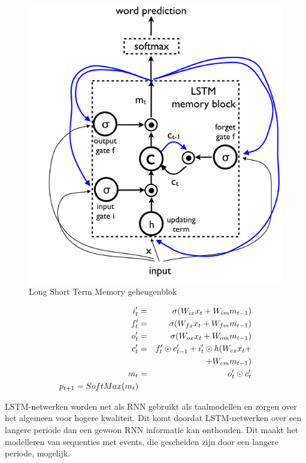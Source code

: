 \begin{figure}[tb]
    \centering
    \includegraphics[width=\linewidth]{Images/lstm.PNG}
    \caption{Long Short Term Memory geheugenblok}
    \label{fig:lstm}
\end{figure}

\begin{eqnarray}
\vspace{-3mm}
\label{glstm-memory-start}
i_t' & = & \sigma (W_{ix} x_t + W_{im} m_{t-1}) \label{glstm-input} \\
f_t' & = & \sigma (W_{fx} x_t + W_{fm} m_{t-1}) \\
o_t' & = & \sigma (W_{ox} x_t + W_{om} m_{t-1}) \\
c_t' & = & f_t' \odot c_{t-1}' + i_t' \odot h(W_{cx} x_t + \nonumber \\
&   & + W_{cm} m_{t-1}) \\
m_t & = & o_t' \odot c_t'\\
p_{t+1} = SoftMax(m_t)
\label{glstm-memory}
\vspace{-3mm}
\end{eqnarray}

LSTM-netwerken worden net als RNN gebruikt als taalmodellen en zorgen over het algemeen voor hogere kwaliteit. Dit komt doordat LSTM-netwerken over een langere periode dan een gewoon RNN informatie kan onthouden. Dit maakt het modelleren van sequenties met events, die gescheiden zijn door een langere periode, mogelijk.


